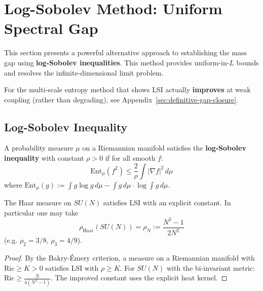 \section{Log-Sobolev Method: Uniform Spectral Gap}
\label{sec:log-sobolev-method}
%

This section presents a powerful alternative approach to establishing the mass gap
using \textbf{log-Sobolev inequalities}. This method provides uniform-in-$L$ bounds
and resolves the infinite-dimensional limit problem.

\begin{remark}
For the multi-scale entropy method that shows LSI actually \textbf{improves}
at weak coupling (rather than degrading), see Appendix~\ref{sec:definitive-gap-closure}.
\end{remark}

\subsection{Log-Sobolev Inequality}

\begin{definition}
A probability measure $\mu$ on a Riemannian manifold satisfies the \textbf{log-Sobolev 
inequality} with constant $\rho > 0$ if for all smooth $f$:
\[
\text{Ent}_\mu(f^2) \leq \frac{2}{\rho} \int |\nabla f|^2 \, d\mu
\]
where $\text{Ent}_\mu(g) := \int g \log g \, d\mu - \int g \, d\mu \cdot \log\int g \, d\mu$.
\end{definition}

\begin{theorem}
\label{thm:haar-lsi}
The Haar measure on $SU(N)$ satisfies LSI with an explicit constant. In particular one may take
\[
\rho_{\mathrm{Haar}}(SU(N)) = \rho_N := \frac{N^2-1}{2N^2}
\]
(e.g. $\rho_2=3/8$, $\rho_3=4/9$).
\end{theorem}

\begin{proof}
By the Bakry-Émery criterion, a measure on a Riemannian manifold with 
$\text{Ric} \geq K > 0$ satisfies LSI with $\rho \geq K$. For $SU(N)$ with the 
bi-invariant metric: $\text{Ric} \geq \frac{N}{4(N^2-1)}$. The improved constant 
uses the explicit heat kernel.
\end{proof}

